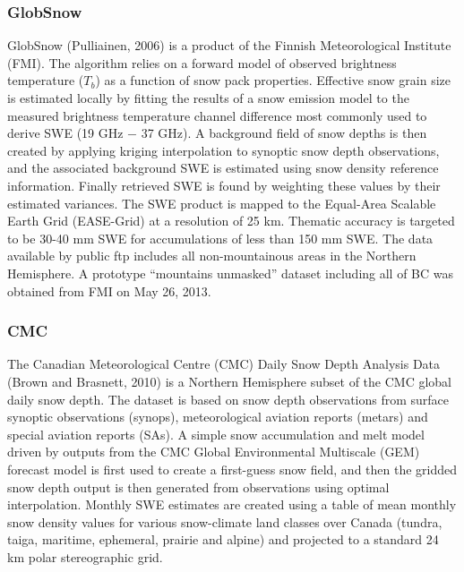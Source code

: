 \documentclass[12pt]{article}
\begin{document}
\subsubsection{GlobSnow}
GlobSnow (Pulliainen, 2006) is a product of the Finnish Meteorological Institute (FMI).  The algorithm relies on a forward model of observed brightness temperature ($T_{b}$) as a function of snow pack properties.  Effective snow grain size is estimated locally by fitting the results of a snow emission model to the measured brightness temperature channel difference most commonly used to derive SWE (19 GHz $-$ 37 GHz).  A background field of snow depths is then created by applying kriging interpolation to synoptic snow depth observations, and the associated background SWE is estimated using snow density reference information.  Finally retrieved SWE is found by weighting these values by their estimated variances.  The SWE product is mapped to the Equal-Area Scalable Earth Grid (EASE-Grid) at a resolution of 25 km.  Thematic accuracy is targeted to be 30-40 mm SWE for accumulations of less than 150 mm SWE.  The data available by public ftp includes all non-mountainous areas in the Northern Hemisphere.  A prototype ``mountains unmasked'' dataset including all of BC was obtained from FMI on May 26, 2013.

\subsubsection{CMC}
The Canadian Meteorological Centre (CMC) Daily Snow Depth Analysis Data (Brown and Brasnett, 2010) is a Northern Hemisphere subset of the CMC global daily snow depth.  The dataset is based on snow depth observations from surface synoptic observations (synops), meteorological aviation reports (metars) and special aviation reports (SAs).  A simple snow accumulation and melt model driven by outputs from the CMC Global Environmental Multiscale (GEM) forecast model is first used to create a first-guess snow field, and then the gridded snow depth output is then generated from observations using optimal interpolation.  Monthly SWE estimates are created using a table of mean monthly snow density values for various snow-climate land classes over Canada (tundra, taiga, maritime, ephemeral, prairie and alpine) and projected to a standard 24 km polar stereographic grid.  
\end{document}
